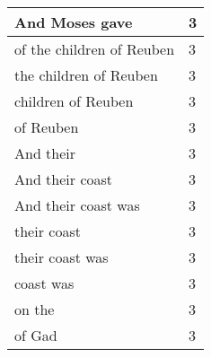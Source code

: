 \begin{center}
\begin{longtable}{|p{3.0in}|p{0.5in}|}
And Moses gave & 3\\ \hline 
of the children of Reuben & 3\\ \hline 
the children of Reuben & 3\\ \hline 
children of Reuben & 3\\ \hline 
of Reuben & 3\\ \hline 
And their & 3\\ \hline 
And their coast & 3\\ \hline 
And their coast was & 3\\ \hline 
their coast & 3\\ \hline 
their coast was & 3\\ \hline 
coast was & 3\\ \hline 
on the & 3\\ \hline 
of Gad & 3\\ \hline 
\end{longtable}
\end{center}





